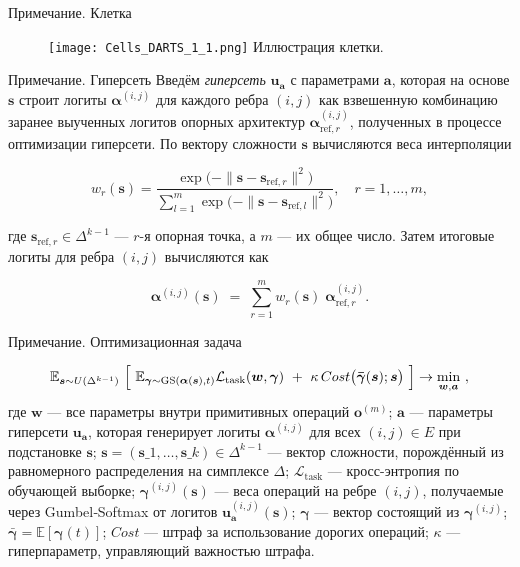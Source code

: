 \documentclass{beamer}
\begin{document}
\begin{frame}{Примечание. Клетка}
    \begin{figure}
        \centering
        \texttt{[image: Cells\_DARTS\_1\_1.png]}
        Иллюстрация клетки.
       
    \end{figure}
\end{frame}
\begin{frame}{Примечание. Гиперсеть}
     Введём \textit{гиперсеть} $\boldsymbol{u}_{\boldsymbol a}$ с параметрами $\boldsymbol a$, которая на основе $\boldsymbol{s}$ строит логиты $\boldsymbol\alpha^{(i,j)}$ для каждого ребра $(i,j)$ как взвешенную комбинацию заранее выученных логитов опорных архитектур $\boldsymbol\alpha_{\text{ref},r}^{(i,j)}$, полученных в процессе оптимизации гиперсети. По вектору сложности $\boldsymbol{s}$ вычисляются веса интерполяции

$$
  w_r(\boldsymbol{s})
  =  
  \frac{\exp\bigl(-\|\boldsymbol{s} - \boldsymbol{s}_{\text{ref},r}\|^2\bigr)}
       {\displaystyle\sum_{l=1}^{m}\exp\bigl(-\|\boldsymbol{s} - \boldsymbol{s}_{\text{ref},l}\|^2\bigr)},
  \quad
  r = 1,\dots,m,
$$

где $\boldsymbol{s}_{\text{ref},r}\in\Delta^{k-1}$ — $r$-я опорная точка, а $m$ — их общее число. Затем итоговые логиты для ребра $(i,j)$ вычисляются как

$$
  \boldsymbol\alpha^{(i,j)}(\boldsymbol{s})
  \;=\;
  \sum_{r=1}^{m} w_r(\boldsymbol{s})\;\boldsymbol\alpha_{\text{ref},r}^{(i,j)}.
$$
\end{frame}

\begin{frame}{Примечание. Оптимизационная задача}
    
$$
\mathbb E_{\boldsymbol s\sim U(\Delta^{k-1})} \ \Bigl[ \ {\mathbb E_{\boldsymbol\gamma\sim\mathrm{GS}(\boldsymbol\alpha(\boldsymbol s),t)} \mathcal L_{\text{task}}(\boldsymbol w,\boldsymbol\gamma)} \ +\  \kappa\,Cost\bigl(\boldsymbol{\bar\gamma}(\boldsymbol s);\boldsymbol s\bigr) \ \Bigr] \rightarrow \min_{\boldsymbol w,\boldsymbol a} \ , 
$$
где $\boldsymbol w$ --- все параметры внутри примитивных операций $\mathbf{o}^{(m)}$;
$\boldsymbol a$ --- параметры гиперсети $\boldsymbol{u}_{\boldsymbol a}$, которая генерирует логиты $\boldsymbol\alpha^{(i,j)}$ для всех $(i,j)\in E$ при подстановке $\boldsymbol{s}$;
$\boldsymbol{s} = (\boldsymbol{s}\_1,\dots,\boldsymbol{s}\_k)\in\Delta^{k-1}$ --- вектор сложности, порождённый из равномерного распределения на симплексе $\Delta$;
$\mathcal L_{\text{task}}$ --- кросс-энтропия по обучающей выборке;
$\boldsymbol\gamma^{(i,j)}(\boldsymbol{s})$ --- веса операций на ребре $(i,j)$, получаемые через Gumbel‐Softmax от логитов $\boldsymbol{u}_{\boldsymbol a}^{(i,j)}(\boldsymbol{s})$; 
$\boldsymbol\gamma$ --- вектор состоящий из $\boldsymbol\gamma^{(i,j)}$;
$\boldsymbol{\bar\gamma} = \mathbb E[\boldsymbol{\gamma}(t)]$; 
$Cost$ --- штраф за использование дорогих операций;
$\kappa$ --- гиперпараметр, управляющий важностью штрафа.

\end{frame}
\end{document}
